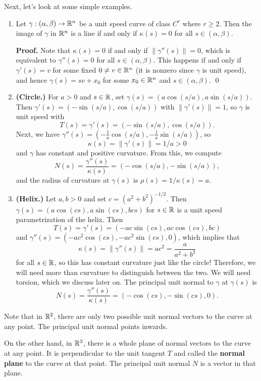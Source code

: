 Next, let's look at some simple examples. 
\begin{enumerate}[(1)]
    \item Let $\gamma : (\alpha, \beta) \to \mathbb{R}^n$ be a unit speed curve 
    of class $C^r$ where $r \geq 2$. Then the image of $\gamma$ in $\mathbb{R}^n$ 
    is a line if and only if $\kappa(s) = 0$ for all $s \in (\alpha, \beta)$. 

    {\bf Proof.} Note that $\kappa(s) = 0$ if and only if $\|\gamma''(s)\| = 0$, 
    which is equivalent to $\gamma''(s) = 0$ for all $s \in (\alpha, \beta)$. 
    This happens if and only if $\gamma'(s) = v$ for some fixed 
    $0 \neq v \in \mathbb{R}^n$ (it is nonzero since $\gamma$ is unit speed), and 
    hence $\gamma(s) = sv + x_0$ for some $x_0 \in \mathbb{R}^n$ and $s \in 
    (\alpha, \beta)$. \qed 

    \item {\bf (Circle.)} For $a > 0$ and $s \in \mathbb{R}$, set 
    $\gamma(s) = (a\cos(s/a), a\sin(s/a))$. Then $\gamma'(s) = 
    (-\sin(s/a), \cos(s/a))$ with $\|\gamma'(s)\| = 1$, so 
    $\gamma$ is unit speed with 
    \[ T(s) = \gamma'(s) = (-\sin(s/a), \cos(s/a)). \] 
    Next, we have $\gamma''(s) = (-\frac1a\cos(s/a), -\frac1a\sin(s/a))$, so 
    \[ \kappa(s) = \|\gamma'(s)\| = 1/a > 0 \] 
    and $\gamma$ has constant and positive curvature. From this, we compute 
    \[ N(s) = \frac{\gamma''(s)}{\kappa(s)} = (-\cos(s/a), -\sin(s/a)), \]
    and the radius of curvature at $\gamma(s)$ is $\rho(s) = 1/\kappa(s) = a$.  

    \item {\bf (Helix.)} Let $a, b > 0$ and set $c = (a^2 + b^2)^{-1/2}$. Then 
    $\gamma(s) = (a\cos(cs), a\sin(cs), bcs)$
    for $s \in \mathbb{R}$ is a unit speed parametrization of the helix. Then 
    \[ T(s) = \gamma'(s) = (-ac\sin(cs), ac\cos(cs), bc) \] 
    and $\gamma''(s) = (-ac^2\cos(cs), -ac^2\sin(cs), 0)$, which implies that 
    \[ \kappa(s) = \|\gamma''(s)\| = ac^2 = \frac{a}{a^2+b^2} \] 
    for all $s \in \mathbb{R}$, so this has constant curvature just like the circle! 
    Therefore, we will need more than curvature to distinguish between the two. 
    We will need torsion, which we discuss later on. The principal unit 
    normal to $\gamma$ at $\gamma(s)$ is 
    \[ N(s) = \frac{\gamma''(s)}{\kappa(s)} = (-\cos(cs), -\sin(cs), 0). \] 
\end{enumerate}
Note that in $\mathbb{R}^2$, there are only two possible unit normal vectors to the 
curve at any point. The principal unit normal points inwards. 

On the other hand, in $\mathbb{R}^3$, there is a whole plane of normal vectors to the curve at 
any point. It is perpendicular to the unit tangent $T$ and called the {\bf normal plane} to 
the curve at that point. The principal unit normal $N$ is a vector in that plane.

